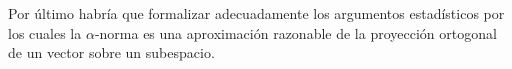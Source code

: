 \documentclass[conference,compsoc,a4paper]{IEEEtran}
\begin{document}
\bigskip

Por último habría que formalizar adecuadamente los argumentos 
estadísticos por los cuales la $\alpha$-norma es una aproximación 
razonable de la proyección ortogonal de un vector sobre un subespacio.

%
%



%
%
\end{document}
